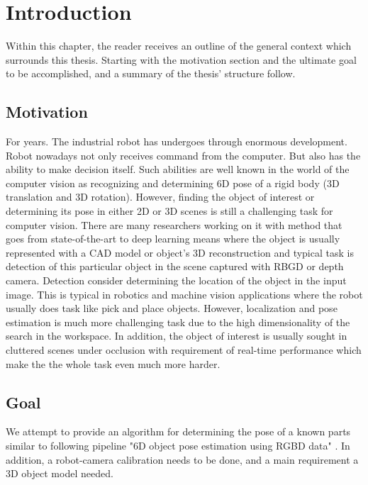 \chapter{Introduction}
\label{chap:intro}

Within this chapter, the reader receives an outline of the general context which surrounds this thesis. Starting with the motivation section and the ultimate goal to be accomplished, and a summary of the thesis' structure follow. 

\section{Motivation}
For years. The industrial robot has undergoes through enormous development. Robot nowadays not only receives command from the computer. But also has the ability to make decision itself. Such abilities are well known in the world of the computer vision as recognizing and determining 6D pose of a rigid body (3D translation and 3D rotation). However, finding the object of interest or determining its pose in either 2D or 3D scenes is still a challenging task for computer vision. There are many researchers working on it with method that goes from state-of-the-art to deep learning means where the object is usually represented with a CAD model or object's 3D reconstruction and typical task is detection of this particular object in the scene captured with RBGD or depth camera. Detection consider determining the location of the object in the input image. This is typical in robotics and machine vision applications where the robot usually does task like pick and place objects. However, localization and pose estimation is much more challenging task due to the high dimensionality of the search in the workspace. In addition, the object of interest is usually sought in cluttered scenes under occlusion with requirement of real-time performance which make the the whole task even much more harder.

\section{Goal}
We attempt to provide an algorithm for determining the pose of a known parts similar to following pipeline "6D object pose estimation using RGBD data" \cite{intro2}. In addition, a robot-camera calibration needs to be done, and a main requirement a 3D object model needed.


